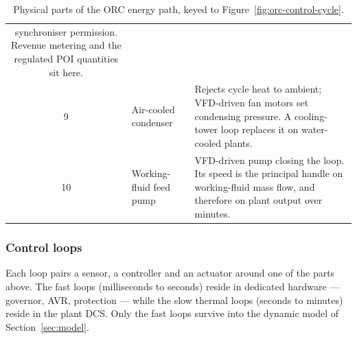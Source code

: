 \begin{table}[htbp]
\begin{tabularx}{\linewidth}{@{}c l X@{}}
                                 synchroniser permission. Revenue metering and
                                 the regulated POI quantities sit here. \\
    9  & Air-cooled condenser  & Rejects cycle heat to ambient; VFD-driven fan
                                 motors set condensing pressure. A cooling-tower
                                 loop replaces it on water-cooled plants. \\
    10 & Working-fluid feed pump
                               & VFD-driven pump closing the loop. Its speed is
                                 the principal handle on working-fluid mass
                                 flow, and therefore on plant output over
                                 minutes. \\
    \bottomrule
  \end{tabularx}
  \caption{Physical parts of the ORC energy path, keyed to
           Figure~\ref{fig:orc-control-cycle}.}
  \label{tab:orc-parts}
\end{table}

\subsubsection{Control loops}
Each loop pairs a sensor, a controller and an actuator around one of the parts
above. The fast loops (milliseconds to seconds) reside in dedicated hardware ---
governor, AVR, protection --- while the slow thermal loops (seconds to minutes)
reside in the plant DCS. Only the fast loops survive into the dynamic model of
Section~\ref{sec:model}.

